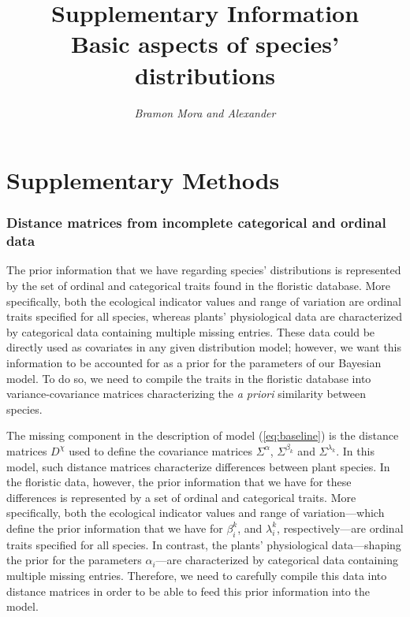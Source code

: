 \documentclass[11pt, a4paper]{article}
\title{\vspace{-1cm} \normalsize Supplementary Information\\\vspace{0.2cm}
\LARGE Basic aspects of species' distributions}
\author{\textit{Bramon Mora and Alexander}}
\date{}
\begin{document}
\maketitle
\thispagestyle{empty}

\clearpage


\section*{Supplementary Methods}
\subsubsection*{Distance matrices from incomplete categorical and ordinal data}
The prior information that we have regarding species' distributions is represented by the set of ordinal and categorical traits found in the floristic database. More specifically, both the ecological indicator values and range of variation are ordinal traits specified for all species, whereas plants' physiological data are characterized by categorical data containing multiple missing entries. These data could be directly used as covariates in any given distribution model; however, we want this information to be accounted for as a prior for the parameters of our Bayesian model. To do so, we need to compile the traits in the floristic database into variance-covariance matrices characterizing the \textit{a priori} similarity between species.

The missing component in the description of model (\ref{eq:baseline}) is the distance matrices $D^{\chi}$ used to define the covariance matrices $\Sigma^{\alpha}$, $\Sigma^{\beta_{k}}$ and $\Sigma^{\lambda_{k}}$. In this model, such distance matrices characterize differences between plant species. In the floristic data, however, the prior information that we have for these differences is represented by a set of ordinal and categorical traits. More specifically, both the ecological indicator values and range of variation---which define the prior information that we have for $\beta_i^k$, and $\lambda_i^k$, respectively---are ordinal traits specified for all species. In contrast, the plants' physiological data---shaping the prior for the parameters $\alpha_i$---are characterized by categorical data containing multiple missing entries. Therefore, we need to carefully compile this data into distance matrices in order to be able to feed this prior information into the model. 
\end{document}
